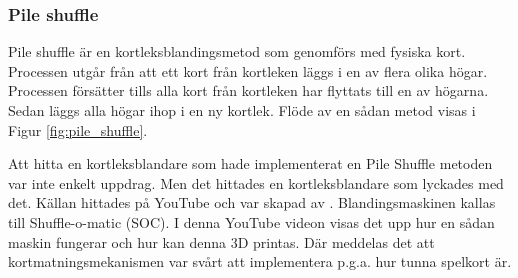\documentclass[swedish,a4paper]{article}
\begin{document}

\subsubsection{Pile shuffle}
\label{sec:pile_shuffle}
Pile shuffle är en kortleksblandingsmetod som genomförs med fysiska
kort. Processen utgår från att ett kort
från kortleken läggs i en av flera olika högar. Processen försätter
tills alla kort från kortleken har flyttats till en av högarna. Sedan
läggs  alla högar ihop i en ny kortlek. Flöde av en sådan metod visas i Figur
\ref{fig:pile_shuffle}.

Att hitta en kortleksblandare som hade implementerat en Pile Shuffle metoden var
inte enkelt uppdrag. Men det hittades en kortleksblandare som lyckades med det.
Källan hittades på YouTube  och var skapad av \textcite{3DprintedLife2021}.
Blandingsmaskinen kallas till Shuffle-o-matic (SOC). I denna YouTube videon visas
det upp hur en sådan maskin fungerar och hur kan denna 3D printas.  Där meddelas
det att kortmatningsmekanismen var svårt att implementera p.g.a. hur tunna
spelkort är.
\end{document}
